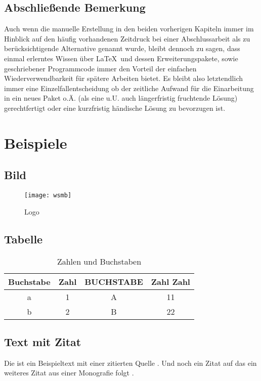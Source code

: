 	\section{Abschließende Bemerkung}
		Auch wenn die manuelle Erstellung in den beiden vorherigen Kapiteln immer im Hinblick auf den häufig vorhandenen Zeitdruck bei einer Abschlussarbeit als zu berücksichtigende Alternative genannt wurde, bleibt dennoch zu sagen, dass einmal erlerntes Wissen über \LaTeX\ und dessen Erweiterungspakete, sowie geschriebener Programmcode immer den Vorteil der einfachen Wiederverwendbarkeit für spätere Arbeiten bietet. Es bleibt also letztendlich immer eine Einzelfallentscheidung ob der zeitliche Aufwand für die Einarbeitung in ein neues Paket o.Ä. (als eine u.U. auch längerfristig fruchtende Lösung) gerechtfertigt oder eine kurzfristig händische Lösung zu bevorzugen ist.
		
\chapter{Beispiele}
	\section{Bild}			
			\begin{figure}[h]
				\centering
				\texttt{[image: wsmb]}		
				\caption{Logo }
			\end{figure}
	\section{Tabelle}
		\begin{table}[h]
			\centering
			\begin{tabular}{cccc}
				\toprule
				Buchstabe &Zahl &BUCHSTABE &Zahl Zahl \\\midrule
				a &1 &A &11 \\
				b &2 &B &22 \\\bottomrule
			\end{tabular}
			\caption{Zahlen und Buchstaben}
		\end{table}
	\section{Text mit Zitat}
		Die ist ein Beispieltext mit einer zitierten Quelle \cite{Blomeke.2006}. Und noch ein Zitat \cite{Hering.2007} auf das ein weiteres Zitat aus einer Monografie folgt \cite[23]{Karmasin.2012}.
